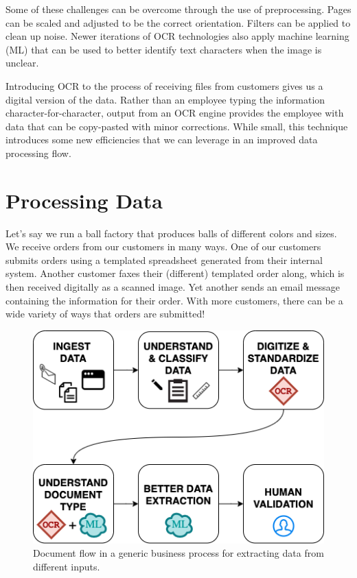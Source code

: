 \documentclass[conference, draftcls]{IEEEtran}
\begin{document}
Some of these challenges can be overcome through the use of preprocessing. Pages can be scaled and adjusted to be the correct orientation. Filters can be applied to clean up noise. Newer iterations of OCR technologies also apply machine learning (ML) that can be used to better identify text characters when the image is unclear.

Introducing OCR to the process of receiving files from customers gives us a digital version of the data. Rather than an employee typing the information character-for-character, output from an OCR engine provides the employee with data that can be copy-pasted with minor corrections. While small, this technique introduces some new efficiencies that we can leverage in an improved data processing flow.

\section{Processing Data} \label{sectionProcessingData}

Let's say we run a ball factory that produces balls of different colors and sizes. We receive orders from our customers in many ways. One of our customers submits orders using a templated spreadsheet generated from their internal system. Another customer faxes their (different) templated order along, which is then received digitally as a scanned image. Yet another sends an email message containing the information for their order. With more customers, there can be a wide variety of ways that orders are submitted!

\begin{figure}[ht]
\centerline{\includegraphics[width=\columnwidth]{HighLevelFlow.png}}
\caption{Document flow in a generic business process for extracting data from different inputs.}
\label{figHighLevelFlow}
\end{figure}
\end{document}
